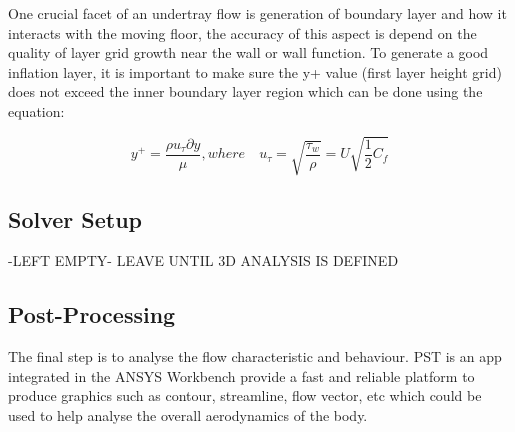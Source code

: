 \noindent One crucial facet of an undertray flow is generation of boundary layer and how it interacts with the moving floor, the accuracy of this aspect is depend on the quality of layer grid growth near the wall or wall function. To generate a good inflation layer, it is important to make sure the y+ value (first layer height grid) does not exceed the inner boundary layer region which can be done using the equation:

\begin{equation}
    y^+ = \frac{\rho u_\tau \partial y}{\mu}, where \quad u_\tau = \sqrt{\frac{\tau_w}{\rho}} = U \sqrt{\frac{1}{2}C_f}
\end{equation}







\subsection{Solver Setup}
-LEFT EMPTY-
LEAVE UNTIL 3D ANALYSIS IS DEFINED

\subsection{Post-Processing}
The final step is to analyse the flow characteristic and behaviour. PST is an app integrated in the ANSYS Workbench provide a fast and reliable platform to produce graphics such as contour, streamline, flow vector, etc which could be used to help analyse the overall aerodynamics of the body. 

